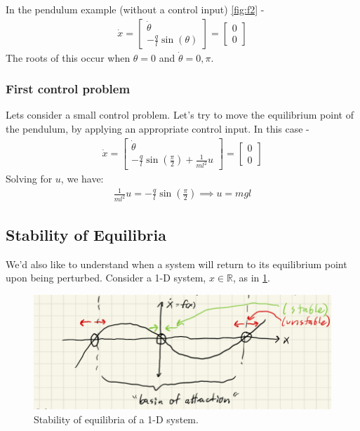 \documentclass{article}
\begin{document}
In the pendulum example (without a control input) \cref{fig:f2} - 
\begin{align}
    \dot{x} = \begin{bmatrix}
        \dot{\theta} \\
        -\frac{q}{l} \sin(\theta) 
    \end{bmatrix}
    = 
    \begin{bmatrix}
        0 \\
        0
    \end{bmatrix}
\end{align}
The roots of this occur when $\theta=0$ and $\dot{\theta}=0, \pi$.

\subsubsection{First control problem}
Lets consider a small control problem. Let's try to move the equilibrium point of the pendulum, by applying an appropriate control input. In this case - 
\begin{align}
    \dot{x} = \begin{bmatrix}
        \dot{\theta} \\
        - \frac{q}{l} \sin(\frac{\pi}{2}) + \frac{1}{ml^2} u 
    \end{bmatrix}
    =
    \begin{bmatrix}
        0 \\
        0
    \end{bmatrix}
\end{align}
Solving for $u$, we have:
\begin{align}
    \frac{1}{ml^2} u = - \frac{q}{l} \sin (\frac{\pi}{2}) 
    \implies u = mgl
\end{align}

\subsection{Stability of Equilibria}
We'd also like to understand when a system will return to its equilibrium point upon being perturbed.
Consider a 1-D system, $x \in \mathbb{R}$, as in \cref{fig:f3}.\\

\begin{figure}
    \centering
    \includegraphics[width=\linewidth]{L1_Images/F3.PNG}
    \caption{Stability of equilibria of a 1-D system.}
    \label{fig:f3}
\end{figure}
\end{document}
